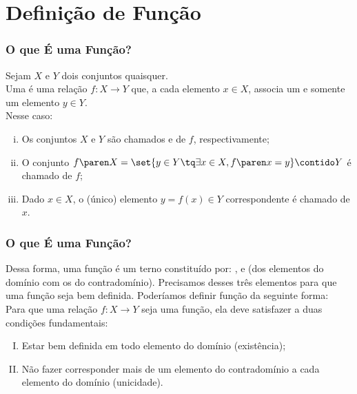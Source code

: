 
\section{Definição de Função}
\begin{frame} \frametitle{O que É uma Função?}
\begin{definicao}
Sejam $X$ e $Y$ dois conjuntos quaisquer.\\
Uma  é uma relação $f: X \to Y$ que, a cada elemento $x
\in X$, associa um e somente um elemento $y \in Y$.\\
Nesse caso:
\begin{enumerate}[(i)]
	\item Os conjuntos $X$ e $Y$ são chamados  e
	 de $f$, respectivamente;
	\item O conjunto $f\paren X = \set{y \in Y \tq \exists x \in X , f \paren x =
	y} \contido Y$ é chamado  de $f$;
	\item Dado $x \in X$, o (único) elemento $y = f(x) \in Y$
	correspondente é chamado  de $x$.
\end{enumerate}
\end{definicao}

\end{frame}


\begin{frame} \frametitle{O que É uma Função?} 

Dessa forma, uma função é um terno constituído por: ,
 e  (dos elementos do
domínio com os do contradomínio). Precisamos desses três elementos
para que uma função seja bem definida. Poderíamos definir
função da seguinte forma: \\
Para que uma relação $f: X \to Y$ seja
uma função, ela deve satisfazer a duas condições fundamentais:
\begin{enumerate}[(I)]
	\item Estar bem definida em todo elemento do domínio (existência);
	\item Não fazer corresponder mais de um elemento do contradomínio
	a cada elemento do domínio (unicidade).
\end{enumerate}

\end{frame}


